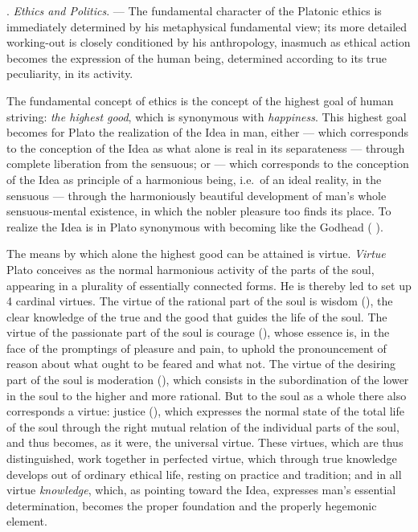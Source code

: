 . \emph{Ethics and Politics}. --- The fundamental character of the Platonic ethics
is immediately determined by his metaphysical
fundamental view; its more detailed working-out is closely conditioned by
his anthropology, inasmuch as ethical action becomes the expression of the human being, determined according to its true peculiarity, in its activity.

The fundamental concept of ethics is the concept of the highest goal of human
striving: \emph{the highest good}, which is synonymous with \emph{happiness}. This highest goal becomes for
Plato the realization of the Idea in man, either --- which
corresponds to the conception of the Idea as what alone is
real in its separateness --- through complete liberation from the sensuous; or --- which corresponds to the conception of the Idea as
principle of a harmonious being, i.e.\ of an ideal reality,
in the sensuous --- through the harmoniously beautiful development
of man's whole sensuous-mental existence, in which
the nobler pleasure too finds its place. To realize the Idea
is in Plato synonymous with becoming like the Godhead ( ).

The means by which alone the highest good can be attained is
virtue. \emph{Virtue} Plato conceives as the normal harmonious
activity of the parts of the soul, appearing in a plurality of
essentially connected forms. He is thereby led to set up
4 cardinal virtues. The virtue of the rational part of the soul is wisdom
(), the clear knowledge of the true and the good
that guides the life of the soul. The virtue of the passionate part of the soul is courage
(), whose essence is, in the face of the promptings of pleasure and pain, to uphold the pronouncement of reason about what ought to be
feared and what not. The virtue of the desiring part of the soul is moderation (), which consists in the subordination of the
lower in the soul to the higher and more rational. But to
the soul as a whole there also corresponds a virtue: justice
(), which expresses the normal state of the total life of the soul through the right mutual relation of the individual parts of the soul, and
thus becomes, as it were, the universal virtue. These virtues, which
are thus distinguished, work together in perfected virtue, which
through true knowledge develops out of ordinary ethical life, resting on
practice and tradition; and in all virtue
\emph{knowledge}, which, as pointing toward the Idea, expresses man's
essential determination, becomes the proper foundation and the properly
hegemonic element.

